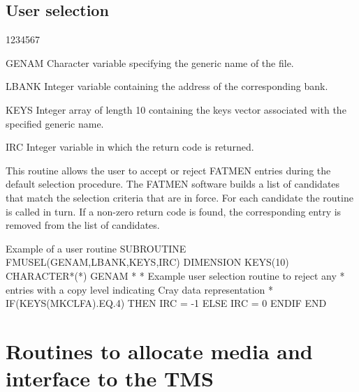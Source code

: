 \subsection{User selection}
\begin{DLtt}{1234567}
\item[GENAM]
Character variable specifying the generic name of the file.
\item[LBANK]
Integer variable containing the address of the corresponding bank.
\item [KEYS]
Integer array of length 10 containing  the keys vector associated
with the specified generic name.
\item[IRC]
Integer variable in which the return code is returned.
\end{DLtt}
\par
This routine allows the user to accept or reject FATMEN entries
during the default selection procedure.
The FATMEN software builds a list of candidates that match
the selection criteria that are in force. For each candidate
the  routine is called in turn. If a non-zero return
code is found, the corresponding entry is removed from the
list of candidates.
\begin{XMPt}{Example of a user \protect{} routine}
      SUBROUTINE FMUSEL(GENAM,LBANK,KEYS,IRC)
      DIMENSION KEYS(10)
      CHARACTER*(*) GENAM
*
*     Example user selection routine to reject any
*     entries with a copy level indicating Cray data representation
*
      IF(KEYS(MKCLFA).EQ.4) THEN
         IRC = -1
      ELSE
         IRC = 0
      ENDIF
      END
\end{XMPt}

\section{Routines to allocate media and interface to the TMS}
